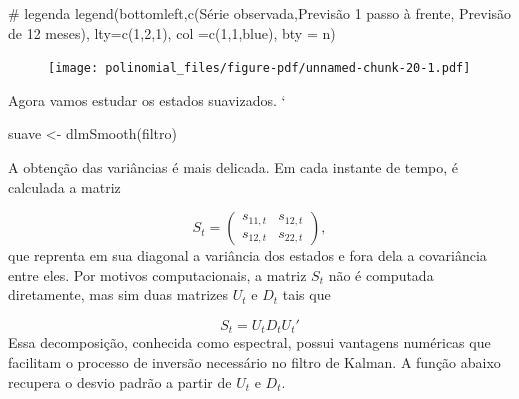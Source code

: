 \documentclass[
  letterpaper,
  DIV=11,
  numbers=noendperiod]{scrreprt}
\newenvironment{Shaded}{\begin{snugshade}}{\end{snugshade}}
\newcommand{\AttributeTok}[1]{\textcolor[rgb]{0.40,0.45,0.13}{#1}}
\newcommand{\CommentTok}[1]{\textcolor[rgb]{0.37,0.37,0.37}{#1}}
\newcommand{\DecValTok}[1]{\textcolor[rgb]{0.68,0.00,0.00}{#1}}
\newcommand{\FunctionTok}[1]{\textcolor[rgb]{0.28,0.35,0.67}{#1}}
\newcommand{\NormalTok}[1]{\textcolor[rgb]{0.00,0.23,0.31}{#1}}
\newcommand{\OtherTok}[1]{\textcolor[rgb]{0.00,0.23,0.31}{#1}}
\newcommand{\StringTok}[1]{\textcolor[rgb]{0.13,0.47,0.30}{#1}}
\begin{document}
\begin{Shaded}
\begin{Highlighting}[]
\CommentTok{\# legenda}
\FunctionTok{legend}\NormalTok{(}\StringTok{\textquotesingle{}bottomleft\textquotesingle{}}\NormalTok{,}\FunctionTok{c}\NormalTok{(}\StringTok{\textquotesingle{}Série observada\textquotesingle{}}\NormalTok{,}\StringTok{\textquotesingle{}Previsão 1 passo à frente\textquotesingle{}}\NormalTok{, }\StringTok{\textquotesingle{}Previsão de 12 meses\textquotesingle{}}\NormalTok{), }\AttributeTok{lty=}\FunctionTok{c}\NormalTok{(}\DecValTok{1}\NormalTok{,}\DecValTok{2}\NormalTok{,}\DecValTok{1}\NormalTok{), }\AttributeTok{col =}\FunctionTok{c}\NormalTok{(}\DecValTok{1}\NormalTok{,}\DecValTok{1}\NormalTok{,}\StringTok{\textquotesingle{}blue\textquotesingle{}}\NormalTok{), }\AttributeTok{bty =} \StringTok{\textquotesingle{}n\textquotesingle{}}\NormalTok{)}
\end{Highlighting}
\end{Shaded}

\begin{figure}[H]

{\centering \texttt{[image: polinomial\_files/figure-pdf/unnamed-chunk-20-1.pdf]}

}

\end{figure}

Agora vamos estudar os estados suavizados. `

\begin{Shaded}
\begin{Highlighting}[]
\NormalTok{suave }\OtherTok{\textless{}{-}} \FunctionTok{dlmSmooth}\NormalTok{(filtro)}
\end{Highlighting}
\end{Shaded}

A obtenção das variâncias é mais delicada. Em cada instante de tempo, é
calculada a matriz

\[S_t=\left( \begin{array}{cc} s_{11,t} & s_{12,t}\\s_{12,t}&s_{22,t}\end{array}\right),\]
que reprenta em sua diagonal a variância dos estados e fora dela a
covariância entre eles. Por motivos computacionais, a matriz \(S_t\) não
é computada diretamente, mas sim duas matrizes \(U_t\) e \(D_t\) tais
que

\[S_t=U_t D_t U_t'\] Essa decomposição, conhecida como espectral, possui
vantagens numéricas que facilitam o processo de inversão necessário no
filtro de Kalman. A função abaixo recupera o desvio padrão a partir de
\(U_t\) e \(D_t\).
\end{document}
